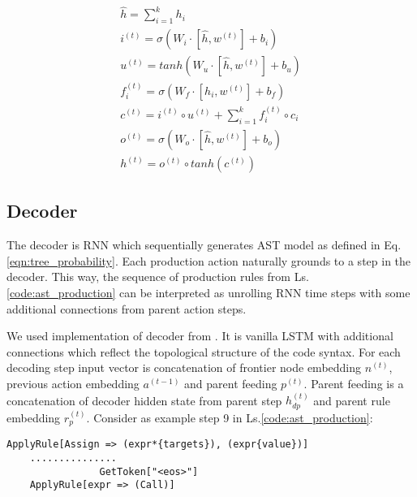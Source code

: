 \begin{equation}
\begin{gathered}
    \hat{h} = \sum^{k}_{i=1}h_i \\
    
    i^{(t)} = \sigma(W_i\cdot[\hat{h}, w^{(t)}]+b_i) \\
    
    u^{(t)} = tanh(W_u\cdot[\hat{h}, w^{(t)}]+b_u) \\
    
    f^{(t)}_i = \sigma(W_{f}\cdot [h_i, w^{(t)}] + b_f) \\
    
    c^{(t)} = i^{(t)} \circ u^{(t)} + \sum_{i=1}^{k} f^{(t)}_i \circ c_i \\
    
    o^{(t)} = \sigma(W_o\cdot[\hat{h}, w^{(t)}]+b_o) \\
    
    h^{(t)} = o^{(t)} \circ tanh(c^{(t)})

\end{gathered}
\label{eq:tree_lstm}
\end{equation}

\subsection{Decoder}
The decoder is RNN which sequentially generates AST model as defined in Eq. \ref{eqn:tree_probability}. Each production action naturally grounds to a step in the decoder. This way, the sequence of production rules from Ls. \ref{code:ast_production} can be interpreted as unrolling RNN time steps with some additional connections from parent action steps.

We used implementation of decoder from \cite{Yin2017}. It is vanilla LSTM with additional connections which reflect the topological structure of the code syntax. For each decoding step input vector is concatenation of frontier node embedding $n^{(t)}$, previous action embedding $a^{(t-1)}$ and parent feeding $p^{(t)}$. Parent feeding is a concatenation of decoder hidden state from parent step $h_{dp}^({t})$ and parent rule embedding $r_p^({t})$. Consider as example step 9 in Ls.\ref{code:ast_production}: 
    
\begin{verbatim}
ApplyRule[Assign => (expr*{targets}), (expr{value})]
    ...............
                GetToken["<eos>"]
    ApplyRule[expr => (Call)]
\end{verbatim}

